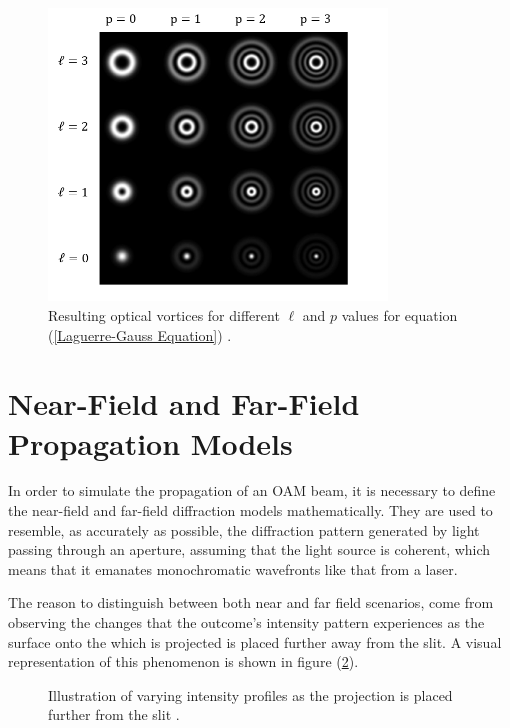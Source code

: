 \begin{figure}[htbp]
    \centering
    \includegraphics[width=9cm]{images/c02/OAM/OAM_given_L_and_P.png}
    \caption{Resulting optical vortices for different $\ell$ and $p$ values for equation (\ref{Laguerre-Gauss Equation}) \cite{OAM_states_Carbone:2013}.}
    \label{fig:OAMs_given_L_and_P}
\end{figure}

\newpage
\section{Near-Field and Far-Field Propagation Models}
\label{c2:Near and Far Field Propagation}

In order to simulate the propagation of an OAM beam, it is necessary to define the near-field and far-field diffraction models mathematically. They are used to resemble, as accurately as possible, the diffraction pattern generated by light passing through an aperture, assuming that the light source is coherent, which means that it emanates monochromatic wavefronts like that from a laser. 

The reason to distinguish between both near and far field scenarios, come from observing the changes that the outcome's intensity pattern experiences as the surface onto the which is projected is placed further away from the slit. A visual representation of this phenomenon is shown in figure (\ref{fig:Diffraction-Distinction}).

\begin{figure}[htbp]
    \centering
    \caption{Illustration of varying intensity profiles as the projection is placed further from the slit \cite{Near-Far_Field_Diff}.}
    \label{fig:Diffraction-Distinction}
\end{figure}


